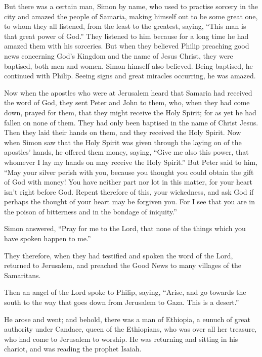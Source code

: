  But there was a certain man, Simon by name, who used to
practise sorcery in the city and amazed the people of Samaria, making
himself out to be some great one,  to whom they all
listened, from the least to the greatest, saying, ``This man is that
great power of God.''  They listened to him because for a
long time he had amazed them with his sorceries.  But
when they believed Philip preaching good news concerning God's Kingdom
and the name of Jesus Christ, they were baptised, both men and women.
 Simon himself also believed. Being baptised, he
continued with Philip. Seeing signs and great miracles occurring, he was
amazed.

 Now when the apostles who were at Jerusalem heard that
Samaria had received the word of God, they sent Peter and John to them,
 who, when they had come down, prayed for them, that they
might receive the Holy Spirit;  for as yet he had fallen
on none of them. They had only been baptised in the name of Christ
Jesus.  Then they laid their hands on them, and they
received the Holy Spirit.  Now when Simon saw that the
Holy Spirit was given through the laying on of the apostles' hands, he
offered them money,  saying, ``Give me also this power,
that whomever I lay my hands on may receive the Holy Spirit.''
 But Peter said to him, ``May your silver perish with
you, because you thought you could obtain the gift of God with money!
 You have neither part nor lot in this matter, for your
heart isn't right before God.  Repent therefore of this,
your wickedness, and ask God if perhaps the thought of your heart may be
forgiven you.  For I see that you are in the poison of
bitterness and in the bondage of iniquity.''

 Simon answered, ``Pray for me to the Lord, that none of
the things which you have spoken happen to me.''

 They therefore, when they had testified and spoken the
word of the Lord, returned to Jerusalem, and preached the Good News to
many villages of the Samaritans.

 Then an angel of the Lord spoke to Philip, saying,
``Arise, and go towards the south to the way that goes down from
Jerusalem to Gaza. This is a desert.''

 He arose and went; and behold, there was a man of
Ethiopia, a eunuch of great authority under Candace, queen of the
Ethiopians, who was over all her treasure, who had come to Jerusalem to
worship.  He was returning and sitting in his chariot,
and was reading the prophet Isaiah.

